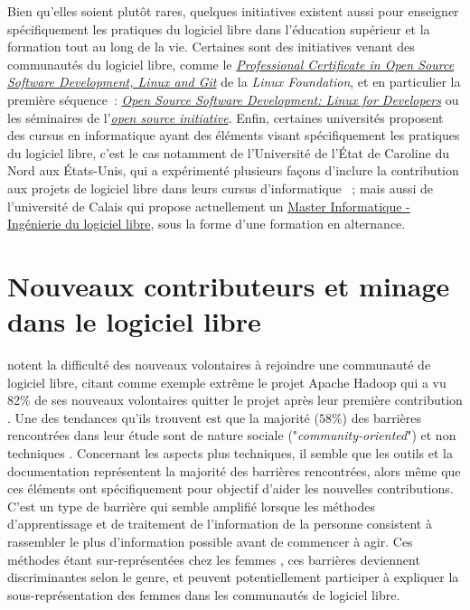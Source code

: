 \documentclass[dvipsnames,runningheads]{llncs}
\newcommand{\en}[1]{\foreignlanguage{english}{\emph{#1}}}
\begin{document}
    Bien qu'elles soient plutôt rares, quelques initiatives existent aussi pour enseigner spécifiquement les
    pratiques du logiciel libre dans l'éducation supérieur et la formation tout au long de la vie. Certaines
    sont des initiatives venant des communautés du logiciel libre, comme le
    \href{https://www.edx.org/professional-certificate/linuxfoundationx-open-source-software-development-linux-and-git}{\en{Professional
    Certificate in Open Source Software Development, Linux and Git}} de la \en{Linux Foundation}, et en
    particulier la première séquence :
    \href{https://www.edx.org/course/open-source-software-development-linux-for-developers}{\en{Open Source
    Software Development: Linux for Developers}} ou les séminaires de
    l'\href{https://opensource.org/osi-open-source-education}{\en{open source initiative}}. Enfin, certaines
    universités proposent des cursus en informatique ayant des éléments visant spécifiquement les pratiques du
    logiciel libre, c'est le cas notamment de l'Université de l'État de Caroline du Nord aux États-Unis, qui a
    expérimenté plusieurs façons d'inclure la contribution aux projets de logiciel libre dans leurs cursus
    d'informatique \cite{oss-edu-2008, oss-edu-2007} ; mais aussi de l'université de Calais qui propose
    actuellement un
    \href{https://www.univ-littoral.fr/formation/offre-de-formation/masters/master-informatique-ingenierie-du-logiciel-libre/}{Master
    Informatique - Ingénierie du logiciel libre}, sous la forme d'une formation en alternance.

    \section{Nouveaux contributeurs et minage dans le logiciel libre}

    \textcite{barriers-2018} notent la difficulté des nouveaux volontaires à rejoindre une communauté de
    logiciel libre, citant comme exemple extrême le projet Apache Hadoop qui a vu 82\% de ses nouveaux
    volontaires quitter le projet après leur première contribution \parencite{hadoop-dropout-2013}. Une des
    tendances qu'ils trouvent est que la majorité ($58\%$) des barrières rencontrées dans leur étude sont de
    nature sociale ("\en{community-oriented}") et non techniques \parencite[p.~1008]{barriers-2018}.
    Concernant les aspects plus techniques, il semble que les outils et la documentation représentent la
    majorité des barrières rencontrées, alors même que ces éléments ont spécifiquement pour objectif d'aider
    les nouvelles contributions. C'est un type de barrière qui semble amplifié lorsque les méthodes
    d'apprentissage et de traitement de l'information de la personne consistent à rassembler le plus
    d'information possible avant de commencer à agir. Ces méthodes étant sur-représentées chez les femmes
    \parencite{gender-information-processing-1995,gender-information-processing-2015}, ces barrières
    deviennent discriminantes selon le genre, et peuvent potentiellement participer à expliquer la
    sous-représentation des femmes dans les communautés de logiciel libre.
\end{document}
